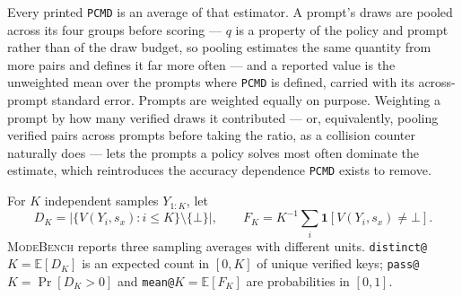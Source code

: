\documentclass{article}
\newcommand{\1}{\mathbf 1}
\newcommand{\E}{\mathbb E}
\newcommand{\mb}{\textsc{ModeBench}}
\newcommand{\pmd}{\texttt{PCMD}}
\theoremstyle{remark}
\theoremstyle{definition}
\theoremstyle{plain}
\begin{document}
Every printed \pmd{} is an average of that estimator. A prompt's draws are
pooled across its four groups before scoring --- $q$ is a property of the
policy and prompt rather than of the draw budget, so pooling estimates the
same quantity from more pairs and defines it far more often --- and a
reported value is the unweighted mean over the prompts where \pmd{} is
defined, carried with its across-prompt standard error. Prompts are weighted
equally on purpose. Weighting a prompt by how many verified draws it
contributed --- or, equivalently, pooling verified pairs across prompts before
taking the ratio, as a collision counter naturally does --- lets the prompts a
policy solves most often dominate the estimate, which reintroduces the accuracy
dependence \pmd{} exists to remove.

For $K$ independent samples $Y_{1:K}$, let
\[
  D_K=\bigl|\{V(Y_i,s_x):i\le K\}\setminus\{\bot\}\bigr|,
  \qquad
  F_K=K^{-1}\sum_i \1[V(Y_i,s_x)\neq\bot].
\]
\mb{} reports three sampling averages with different units. \texttt{distinct@}$K
=\E[D_K]$ is an expected count in $[0,K]$ of unique verified keys;
\texttt{pass@}$K=\Pr[D_K>0]$ and \texttt{mean@}$K=\E[F_K]$ are probabilities
in $[0,1]$.
\end{document}
